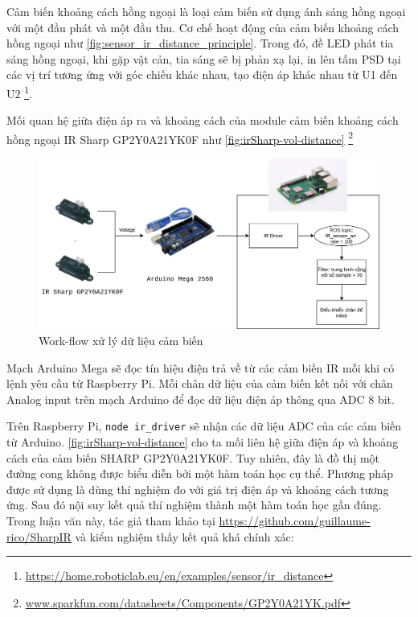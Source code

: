 Cảm biến khoảng cách hồng ngoại là loại cảm biến sử dụng ánh sáng hồng ngoại với một đầu phát và một đầu thu. Cơ chế hoạt động của cảm biến khoảng cách hồng ngoại như \figurename{\ref{fig:sensor_ir_distance_principle}}. Trong đó, đề LED phát tia sáng hồng ngoại, khi gặp vật cản, tia sáng sẽ bị phản xạ lại, in lên tấm PSD tại các vị trí tương ứng với góc chiếu khác nhau, tạo điện áp khác nhau từ U1 đến U2 \footnote{\url{https://home.roboticlab.eu/en/examples/sensor/ir_distance}}. 

Mối quan hệ giữa điện áp ra và khoảng cách của module cảm biến khoảng cách hồng ngoại IR Sharp GP2Y0A21YK0F như \figurename{\ref{fig:irSharp-vol-distance}} \footnote{\url{www.sparkfun.com/datasheets/Components/GP2Y0A21YK.pdf}}

\begin{figure}[htbp]
    \centering
    \includegraphics[width=\linewidth]{figures/ir_safety_controller-dataProcessing.png}
    \caption{Work-flow xử lý dữ liệu cảm biến}
    \label{fig:workflow-dataProcessing}
\end{figure}

Mạch Arduino Mega sẽ đọc tín hiệu điện trả về từ các cảm biến IR mỗi khi có lệnh yêu cầu từ Raspberry Pi. Mỗi chân dữ liệu của cảm biến kết nối với chân Analog input trên mạch Arduino để đọc dữ liệu điện áp thông qua ADC 8 bit.

Trên Raspberry Pi, {\tt node ir\_driver} sẽ nhận các dữ liệu ADC của các cảm biến từ Arduino. \figurename{\ref{fig:irSharp-vol-distance}} cho ta mối liên hệ giữa điện áp và khoảng cách của cảm biến SHARP GP2Y0A21YK0F. Tuy nhiên, đây là đồ thị một đường cong không được biểu diễn bởi một hàm toán học cụ thể. Phương pháp được sử dụng là dùng thí nghiệm đo với giá trị điện áp và khoảng cách tương ứng. Sau đó nội suy kết quả thí nghiệm thành một hàm toán học gần đúng. Trong luận văn này, tác giả tham khảo tại \url{https://github.com/guillaume-rico/SharpIR} và kiểm nghiệm thấy kết quả khá chính xác: 

